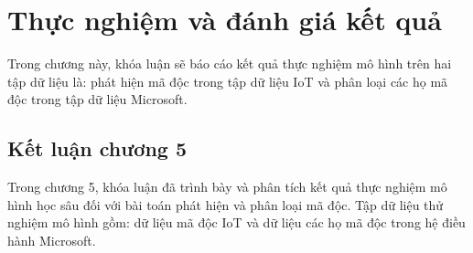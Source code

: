 \chapter{Thực nghiệm và đánh giá kết quả}
Trong chương này, khóa luận sẽ báo cáo kết quả thực nghiệm mô hình trên hai tập dữ liệu là: phát hiện mã độc trong tập dữ liệu IoT và phân loại các họ mã độc trong tập dữ liệu Microsoft.


\section*{Kết luận chương 5}
Trong chương 5, khóa luận đã trình bày và phân tích kết quả thực nghiệm mô hình học sâu đối với bài toán phát hiện và phân loại mã độc. Tập dữ liệu thử nghiệm mô hình gồm: dữ liệu mã độc IoT và dữ liệu các họ mã độc trong hệ điều hành Microsoft.
